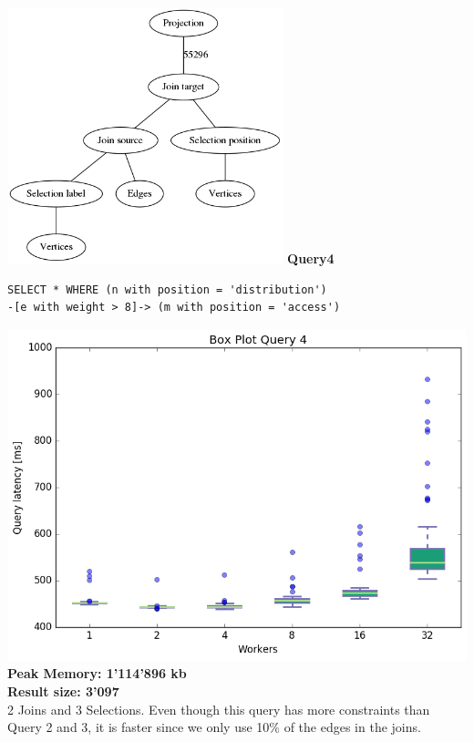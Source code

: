 \documentclass[11pt,singlecolumn]{scrartcl}
\begin{document}
\includegraphics[width=0.6\textwidth]{graph3}
\clearpage
\textbf{Query4}\\
\begin{verbatim}
SELECT * WHERE (n with position = 'distribution')
-[e with weight > 8]-> (m with position = 'access')\end{verbatim}
\includegraphics[width=1\textwidth]{box/q4}
\textbf{Peak Memory: 1'114'896 kb}\\
\textbf{Result size: 3'097}\\
2 Joins and 3 Selections. Even though this query has more constraints than Query 2 and 3, it is faster since we only use 10\% of the edges in the joins. 
\clearpage
\end{document}
